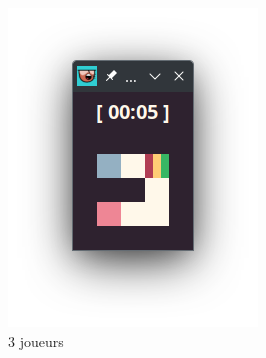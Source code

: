 \begin{figure}[!htb]
\begin{subfigure}[b]{0.2\textwidth}
        \includegraphics[width=\textwidth]{ressources/Implementation/Labyrinthe/Vue/Players/3Players.png}
        \caption{3 joueurs}
    \end{subfigure}
    \hfill
    \begin{subfigure}[b]{0.2\textwidth}

\end{subfigure}
\end{figure}
